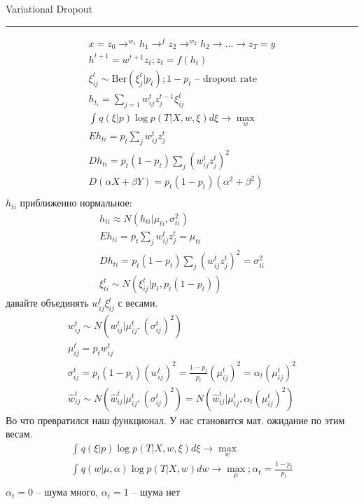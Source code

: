 \documentclass{minimal}
\begin{document}
Variational Dropout\\
\hrule
\begin{gather*}
  x=z_0\rightarrow^{w_1}h_1\rightarrow^{f}z_2\rightarrow^{w_2}h_2\rightarrow\dots\rightarrow z_T=y\\
  h^{t+1}= w^{t+1}z_t; z_t=f(h_t)\\
  \xi_{ij}^{t} \sim \mathrm{Ber}(\xi_j^t|p_t); 1-p_t \textrm{ -- dropout rate}\\
  h_{t_i}=\sum_{j=1}^{} {w^t_{ij}z_j^{t-1}\xi^{t}_{ij}}\\
  \int_{}^{} {q(\xi|p)\log p(T|X,w,\xi)d\xi} \rightarrow \max_w\\
  Eh_{ti}=p_t \sum_{j}^{} {w^t_{ij}z^t_{j}}\\
  Dh_{ti}=p_t(1-p_t)\sum_{j}^{} {(w^{t}_{ij}z_j^t)^2}\\
  D(\alpha X+\beta Y)=p_t(1-p_t)(\alpha^2+\beta^2)\\
\end{gather*}
$h_{ti}$ приближенно нормальное:
\begin{gather*}
  h_{ti} \approx N(h_{ti}|\mu_{ti}, \sigma^2_{ti})\\
  Eh_{ti}=p_t \sum_{j}^{} {w^t_{ij}z^t_{j}}=\mu_{ti}\\
  Dh_{ti}=p_t(1-p_t)\sum_{j}^{} {(w^{t}_{ij}z_j^t)^2}=\sigma^2_{ti}\\
  \xi^t_{ti} \sim N(\xi^t_{ij}|p_t, p_t(1-p_t))
\end{gather*}
давайте объединять $w^t_{ij}\xi^t_{ij}$ с весами.
 \begin{gather*}
   w^t_{ij} \sim N(w^t_{ij}|\mu^t_{ij},(\sigma^t_{ij})^2)\\
   \mu^t_{ij} = p_tw^t_{ij}\\
   \sigma^t_{ij} = p_t(1-p_t)(w^t_{ij})^2=\frac{1-p_t}{p_t}(\mu^t_{ij})^2=\alpha_t(\mu^t_{ij})^2\\
   \hat{w}^t_{ij} \sim N\left(\hat{w}^t_{ij}|\mu^t_{ij},(\sigma^t_{ij})^2\right)=N\left(\hat{w}^t_{ij}|\mu^t_{ij}, \alpha_t(\mu^t_{ij})^2\right)
\end{gather*}
Во что превратился наш функционал. У нас становится мат. ожидание по этим весам.
\begin{gather*}
  \int_{}^{} {q(\xi|p)\log p(T|X,w,\xi)d\xi} \rightarrow \max_w\\
  \int_{}^{} {q(w|\mu, \alpha)\log p(T|X,w)dw} \rightarrow \max_\mu; \alpha_t = \frac{1-p_t}{p_t}\\
\end{gather*}
$\alpha_t=0$ -- шума много, $\alpha_t=1$ -- шума нет\\
\end{document}
